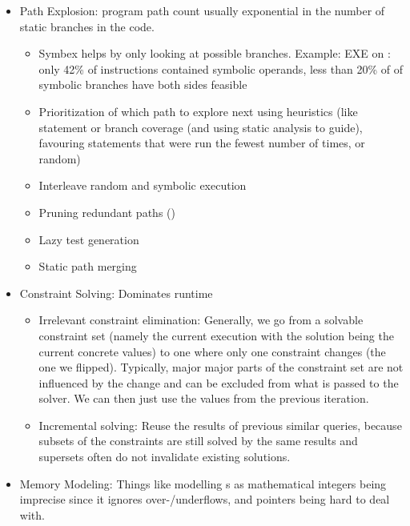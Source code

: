 \documentclass{article}
\begin{document}
\begin{itemize}
\begin{itemize}
          \item Path Explosion: program path count usually exponential in the number of static branches in the code.
                \begin{itemize}
                  \item Symbex helps by only looking at possible branches. Example: EXE\cite{EXE} on : only 42\% of instructions contained symbolic operands, less than 20\% of of symbolic branches have both sides feasible\cite{EXE}
                  \item Prioritization of which path to explore next using heuristics (like statement or branch coverage (and using static analysis to guide), favouring statements that were run the fewest number of times, or random)
                  \item Interleave random and symbolic execution
                  \item Pruning redundant paths (\cite{RWset})
                  \item Lazy test generation
                  \item Static path merging
                \end{itemize}
          \item Constraint Solving: Dominates runtime
                \begin{itemize}
                  \item Irrelevant constraint elimination: Generally, we go from a solvable constraint set (namely the current execution with the solution being the current concrete values) to one where only one constraint changes (the one we flipped). Typically, major major parts of the constraint set are not influenced by the change and can be excluded from what is passed to the solver. We can then just use the values from the previous iteration.
                  \item Incremental solving: Reuse the results of previous similar queries, because subsets of the constraints are still solved by the same results and supersets often do not invalidate existing solutions.
                \end{itemize}
          \item Memory Modeling: Things like modelling s as mathematical integers being imprecise since it ignores over-/underflows, and pointers being hard to deal with. \cite{ReviewThreeDecades}

\end{itemize}
\end{itemize}
\end{document}
